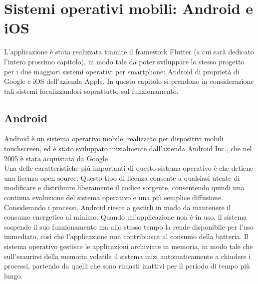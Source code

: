 \chapter{Sistemi operativi mobili: Android e iOS}
L'applicazione è stata realizzata tramite il framework Flutter (a cui sarà
dedicato l'intero prossimo capitolo), in modo tale da poter sviluppare lo stesso
progetto per i due maggiori sistemi operativi per smartphone: Android di
proprietà di Google e iOS dell'azienda Apple. In questo capitolo si prendono in
considerazione tali sistemi focalizzandosi soprattutto sul funzionamento.

\section{Android}
Android è un sistema operativo mobile, realizzato per dispositivi mobili
touchscreen, ed è stato sviluppato inizialmente dall'azienda Android Inc., che
nel 2005 è stata acquistata da Google \cite{3}.\\
Una delle caratteristiche più importanti di questo sistema operativo è che 
detiene una licenza open source. Questo tipo di licenza consente a
qualsiasi utente di modificare e distribuire liberamente il codice
sorgente, consentendo quindi una continua evoluzione del sistema operativo e una
più semplice diffusione. Considerando i processi, Android riesce a gestirli in
modo da mantenere il consumo energetico al minimo. Quando un’applicazione non è
in uso, il sistema sospende il suo funzionamento ma allo stesso tempo la rende
disponibile per l’uso immediato, così che l’applicazione non contribuisca
al consumo della batteria. Il sistema operativo gestisce le applicazioni archiviate in
memoria, in modo tale che sull'esaurirsi della memoria volatile il sistema inizi
automaticamente a chiudere i processi, partendo da quelli che sono rimasti
inattivi per il periodo di tempo più lungo.

